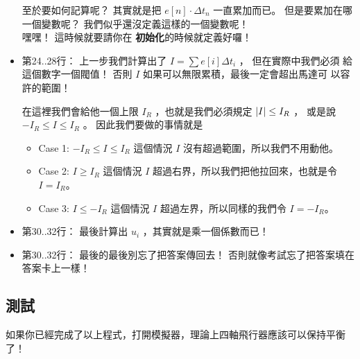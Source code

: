 \documentclass[12pt, a4paper]{article}
\DeclarePairedDelimiter{\abs}{\lvert}{\rvert}
\begin{document}
\begin{itemize}
    至於要如何記算呢？ 其實就是把 $e[n] \cdot \Delta t_n$ 一直累加而已。
    但是要累加在哪一個變數呢？ 我們似乎還沒定義這樣的一個變數呢！ \\
    嘿嘿！ 這時候就要請你在 {\bf 初始化}的時候就定義好囉！

  \item 第24..28行：
    上一步我們計算出了 $I = \sum e[i] \Delta t_i$ ， 但在實際中我們必須
    給這個數字一個閥值！ 否則 $I$ 如果可以無限累積，最後一定會超出馬達可
    以容許的範圍！ 

    在這裡我們會給他一個上限 $I_R$ ，也就是我們必須規定 $\abs{I} \leq I_R$ ，
    或是說 $-I_R \leq I \leq I_R$ 。 因此我們要做的事情就是
    \begin{itemize}
      \item Case 1: $-I_R \leq I \leq I_R$ 
            這個情況 $I$ 沒有超過範圍，所以我們不用動他。
      \item Case 2: $I \geq I_R$ 
            這個情況 $I$ 超過右界，所以我們把他拉回來，也就是令 $I = I_R$。
      \item Case 3: $I \leq -I_R$ 
            這個情況 $I$ 超過左界，所以同樣的我們令 $I = -I_R$。
    \end{itemize}

  \item 第30..32行：
    最後計算出 $u_i$ ，其實就是乘一個係數而已！

  \item 第30..32行：
    最後的最後別忘了把答案傳回去！
    否則就像考試忘了把答案填在答案卡上一樣！
  
\end{itemize}
\subsection{ 測試 }
如果你已經完成了以上程式，打開模擬器，理論上四軸飛行器應該可以保持平衡了！
\end{document}
